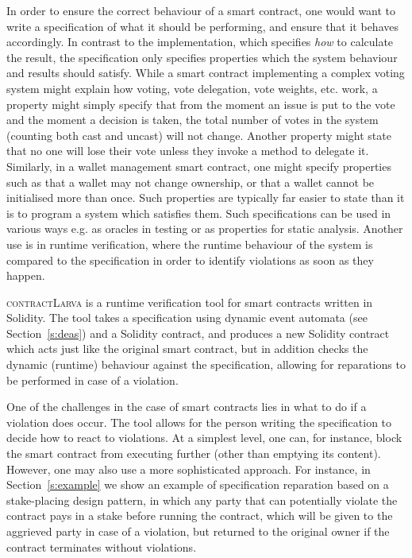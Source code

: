 \documentclass{article}
\newcommand{\contractlarva}{\textsc{contractLarva}\xspace}
\begin{document}
  In order to ensure the correct behaviour of a smart contract, one would want to write a specification of what it should be performing, and ensure that it behaves accordingly. In contrast to the implementation, which specifies \emph{how} to calculate the result, the specification only specifies properties which the system behaviour and results should satisfy. While a smart contract implementing a complex voting system might explain how voting, vote delegation, vote weights, etc. work, a property might simply specify that from the moment an issue is put to the vote and the moment a decision is taken, the total number of votes in the system (counting both cast and uncast) will not change. Another property might state that no one will lose their vote unless they invoke a method to delegate it. Similarly, in a wallet management smart contract, one might specify properties such as that a wallet may not change ownership, or that a wallet cannot be initialised more than once. Such properties are typically far easier to state than it is to program a system which satisfies them. Such specifications can be used in various ways e.g. as oracles in testing or as properties for static analysis. Another use is in runtime verification, where the runtime behaviour of the system is compared to the specification in order to identify violations as soon as they happen.

  \contractlarva is a runtime verification tool for smart contracts written in Solidity. The tool takes a specification using dynamic event automata (see Section~\ref{s:deas}) and a Solidity contract, and produces a new Solidity contract which acts just like the original smart contract, but in addition checks the dynamic (runtime) behaviour against the specification, allowing for reparations to be performed in case of a violation.

 One of the challenges in the case of smart contracts lies in what to do if a violation does occur. The tool allows for the person writing the specification to decide how to react to violations. At a simplest level, one can, for instance, block the smart contract from executing further (other than emptying its content).  However, one may also use a more sophisticated approach. For instance, in Section~\ref{s:example} we show an example of specification reparation based on a stake-placing design pattern, in which any party that can potentially violate the contract pays in a stake before running the contract, which will be given to the aggrieved party in case of a violation, but returned to the original owner if the contract terminates without violations. 
 
\end{document}
